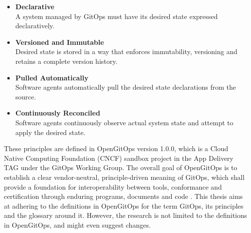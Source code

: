 \begin{itemize}
	\item \textbf{Declarative} \\
		A system managed by GitOps must have its desired state expressed declaratively.
	\item \textbf{Versioned and Immutable} \\
		Desired state is stored in a way that enforces immutability, versioning and retains a complete version history.
	\item \textbf{Pulled Automatically} \\
		Software agents automatically pull the desired state declarations from the source.
	\item \textbf{Continuously Reconciled} \\
		Software agents continuously observe actual system state and attempt to apply the desired state.
\end{itemize}


\noindent
These principles are defined in OpenGitOps version 1.0.0,
which is a Cloud Native Computing Foundation (CNCF) sandbox project
in the App Delivery TAG 
under the GitOps Working Group.
The overall goal of OpenGitOps is to establish a clear vendor-neutral,
principle-driven meaning of GitOps,
which shall provide a foundation for interoperability between tools, conformance and certification through enduring programs, documents and code
\autocite{opengitopsDocuments}.
This thesis aims at adhering to the definitions in OpenGitOps
for the term GitOps, its principles and the glossary around it.
However, the research is not limited to the definitions in OpenGitOps,
and might even suggest changes.




